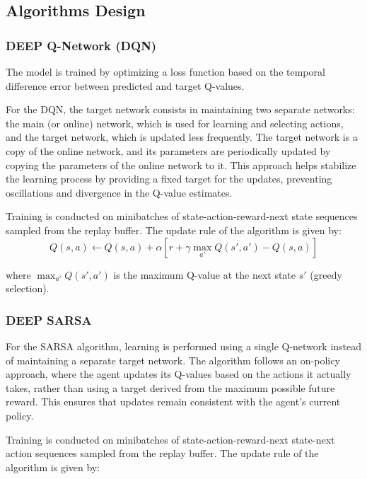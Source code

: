 \documentclass[../CSC_52081_EP.tex]{subfiles}
\begin{document}
\subsection{Algorithms Design}

\hspace{1cm}

\subsubsection{DEEP Q-Network (DQN)}
The model is trained by optimizing a loss function based on the temporal difference error between predicted and target Q-values. 

For the DQN, the target network consists in maintaining two separate networks: the main (or online) network, which is used for learning and selecting actions, and the target network, which is updated less frequently. The target network is a copy of the online network, and its parameters are periodically updated by copying the parameters of the online network to it. This approach helps stabilize the learning process by providing a fixed target for the updates, preventing oscillations and divergence in the Q-value estimates.

Training is conducted on minibatches of state-action-reward-next state sequences sampled from the replay buffer. The update rule of the algorithm is given by:
    \begin{equation}
        Q(s, a) \leftarrow Q(s, a) + \alpha \left[ r + \gamma \max_{a'} Q(s', a') - Q(s, a) \right]
    \end{equation}
    
    where $\max_{a'} Q(s', a')$ is the maximum Q-value at the next state $s'$ (greedy selection).

\hspace{1cm}

\subsubsection{DEEP SARSA}
For the SARSA algorithm, learning is performed using a single Q-network instead of maintaining a separate target network. The algorithm follows an on-policy approach, where the agent updates its Q-values based on the actions it actually takes, rather than using a target derived from the maximum possible future reward. This ensures that updates remain consistent with the agent’s current policy.

Training is conducted on minibatches of state-action-reward-next state-next action sequences sampled from the replay buffer. The update rule of the algorithm is given by:
\end{document}
